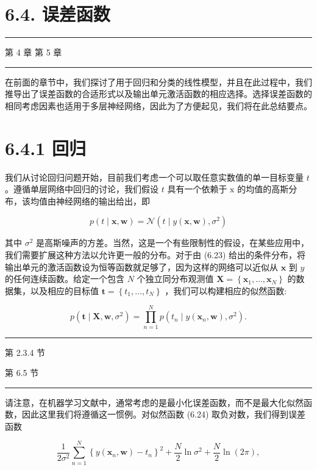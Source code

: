 \documentclass[10pt]{report}
\newcommand{\HRule}{\begin{center}\rule{0.9\linewidth}{0.2mm}\end{center}}
\begin{document}
\section*{6.4. 误差函数}

\HRule

第 4 章 第 5 章

\HRule

在前面的章节中，我们探讨了用于回归和分类的线性模型，并且在此过程中，我们推导出了误差函数的合适形式以及输出单元激活函数的相应选择。选择误差函数的相同考虑因素也适用于多层神经网络，因此为了方便起见，我们将在此总结要点。

\section*{6.4.1 回归}

我们从讨论回归问题开始，目前我们考虑一个可以取任意实数值的单一目标变量 \(t\) 。遵循单层网络中回归的讨论，我们假设 \(t\) 具有一个依赖于 \(\mathrm{x}\) 的均值的高斯分布，该均值由神经网络的输出给出，即

\[
p\left( {t \mid  \mathbf{x},\mathbf{w}}\right)  = \mathcal{N}\left( {t \mid  y\left( {\mathbf{x},\mathbf{w}}\right) ,{\sigma }^{2}}\right)  \tag{6.23}
\]

其中 \({\sigma }^{2}\) 是高斯噪声的方差。当然，这是一个有些限制性的假设，在某些应用中，我们需要扩展这种方法以允许更一般的分布。对于由 (6.23) 给出的条件分布，将输出单元的激活函数设为恒等函数就足够了，因为这样的网络可以近似从 \(\mathbf{x}\) 到 \(y\) 的任何连续函数。给定一个包含 \(N\) 个独立同分布观测值 \(\mathbf{X} = \left\{  {{\mathbf{x}}_{1},\ldots ,{\mathbf{x}}_{N}}\right\}\) 的数据集，以及相应的目标值 \(\mathbf{t} = \left\{  {{t}_{1},\ldots ,{t}_{N}}\right\}\) ，我们可以构建相应的似然函数:

\[
p\left( {\mathbf{t} \mid  \mathbf{X},\mathbf{w},{\sigma }^{2}}\right)  = \mathop{\prod }\limits_{{n = 1}}^{N}p\left( {{t}_{n} \mid  y\left( {{\mathbf{x}}_{n},\mathbf{w}}\right) ,{\sigma }^{2}}\right) . \tag{6.24}
\]

\HRule

第 2.3.4 节

第 6.5 节

\HRule

请注意，在机器学习文献中，通常考虑的是最小化误差函数，而不是最大化似然函数，因此这里我们将遵循这一惯例。对似然函数 (6.24) 取负对数，我们得到误差函数

\[
\frac{1}{2{\sigma }^{2}}\mathop{\sum }\limits_{{n = 1}}^{N}{\left\{  y\left( {\mathbf{x}}_{n},\mathbf{w}\right)  - {t}_{n}\right\}  }^{2} + \frac{N}{2}\ln {\sigma }^{2} + \frac{N}{2}\ln \left( {2\pi }\right) , \tag{6.25}
\]
\end{document}
